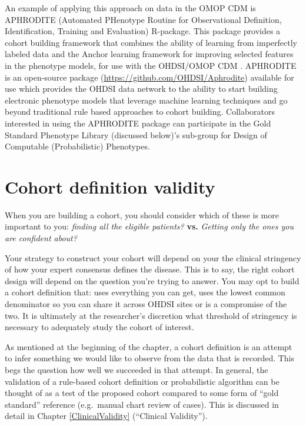 \documentclass[11pt]{book}
\theoremstyle{definition}
\theoremstyle{definition}
\theoremstyle{definition}
\theoremstyle{remark}
\begin{document}
An example of applying this approach on data in the OMOP CDM is APHRODITE (Automated PHenotype Routine for Observational Definition, Identification, Training and Evaluation) R-package. This package provides a cohort building framework that combines the ability of learning from imperfectly labeled data and the Anchor learning framework for improving selected features in the phenotype models, for use with the OHDSI/OMOP CDM \citep{Banda2017APHRODITE}. APHRODITE is an open-source package (\url{https://github.com/OHDSI/Aphrodite}) available for use which provides the OHDSI data network to the ability to start building electronic phenotype models that leverage machine learning techniques and go beyond traditional rule based approaches to cohort building. Collaborators interested in using the APHRODITE package can participate in the Gold Standard Phenotype Library (discussed below)'s sub-group for Design of Computable (Probabilistic) Phenotypes. 

\hypertarget{cohort-definition-validity}{%
\section{Cohort definition validity}\label{cohort-definition-validity}}

When you are building a cohort, you should consider which of these is more important to you: \emph{finding all the eligible patients?} \textbf{vs.} \emph{Getting only the ones you are confident about?}

Your strategy to construct your cohort will depend on your the clinical stringency of how your expert consensus defines the disease. This is to say, the right cohort design will depend on the question you're trying to answer. You may opt to build a cohort definition that: uses everything you can get, uses the lowest common denominator so you can share it across OHDSI sites or is a compromise of the two. It is ultimately at the researcher's discretion what threshold of stringency is necessary to adequately study the cohort of interest.

As mentioned at the beginning of the chapter, a cohort definition is an attempt to infer something we would like to observe from the data that is recorded. This begs the question how well we succeeded in that attempt. In general, the validation of a rule-based cohort definition or probabilistic algorithm can be thought of as a test of the proposed cohort compared to some form of ``gold standard'' reference (e.g.~manual chart review of cases). This is discussed in detail in Chapter \ref{ClinicalValidity} (``Clinical Validity'').
\end{document}

